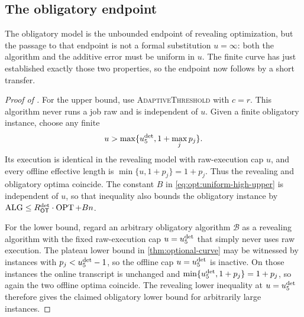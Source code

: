 \subsection{The obligatory endpoint}
\label{sec:obligatory}

The obligatory model is the unbounded endpoint of revealing optimization,
but the passage to that endpoint is not a formal substitution
$u=\infty$: both the algorithm and the additive error must be uniform in
$u$.  The finite curve has just established exactly those two properties,
so the endpoint now follows by a short transfer.

\begin{proof}[Proof of ]
For the upper bound, use \textsc{AdaptiveThreshold} with $c=r$.  This
algorithm never runs a job raw and is independent of $u$.  Given a finite
obligatory instance, choose any finite
\[
 u>\max\{u_{5}^{\mathrm{det}},1+\max_j p_j\}.
\]
Its execution is identical in the revealing model with raw-execution cap
$u$, and every
offline effective length is
$\min\{u,1+p_j\}=1+p_j$.  Thus the revealing and obligatory optima coincide.
The constant $B$ in \cref{eq:opt:uniform-high-upper} is independent of $u$,
so that inequality also bounds the obligatory instance by
$\operatorname{ALG}\le R_{\mathsf{OT}}^{\mathrm{det}}\cdot\operatorname{OPT}+Bn$.

For the lower bound, regard an arbitrary obligatory algorithm $\mathcal B$
as a revealing algorithm with the fixed raw-execution cap $u=u_{5}^{\mathrm{det}}$ that
simply never uses raw execution.  The plateau lower bound in
\cref{thm:optional-curve} may be
witnessed by instances with $p_j<u_{5}^{\mathrm{det}}-1$, so the offline cap
$u=u_{5}^{\mathrm{det}}$ is inactive.  On those instances the
online transcript is unchanged and
$\min\{u_{5}^{\mathrm{det}},1+p_j\}=1+p_j$, so again the two offline optima coincide.  The
revealing lower inequality at $u=u_{5}^{\mathrm{det}}$ therefore gives the claimed
obligatory lower bound for arbitrarily large instances.
\end{proof}
